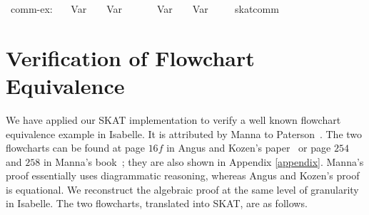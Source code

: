 \documentclass{llncs}
\begin{document}
\begin{isabellebody}
\isanewline
{}\isamarkupfalse%
\ comm-ex:
\ {}{}\ {}{}\ Var\ {}{}\ {}\ {}{}\ Var\ {}\ \ {}\ \ {}\  {}{}\ Var\ {}{}\ {}\ {}{}\ Var\ {}{}\isanewline
%
\isadelimproof
\ \ %
\endisadelimproof
%
\isatagproof
{}\isamarkupfalse%
\ skat{}comm%
\endisatagproof
\end{isabellebody}


\section{Verification of Flowchart Equivalence}
\label{sec:flowchartproof}

We have applied our SKAT implementation to verify a well known
flowchart equivalence example in Isabelle. It is attributed by Manna
to Paterson~\cite{Manna}. The two flowcharts can be found at page
$16f$ in Angus and Kozen's paper~\cite{Angus} or page $254$ and $258$
in Manna's book~\cite{Manna}; they are also shown in Appendix
\ref{appendix}. Manna's proof essentially uses diagrammatic reasoning,
whereas Angus and Kozen's proof is equational. We reconstruct the
algebraic proof at the same level of granularity in Isabelle. The two
flowcharts, translated into SKAT, are as follows.
\end{document}
